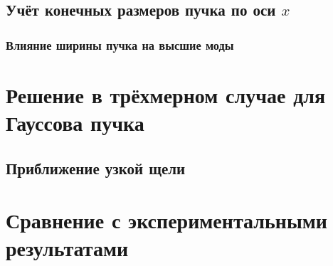 \section{Учёт конечных размеров пучка по оси $x$}
\subsection{Влияние ширины пучка на высшие моды}

\chapter{Решение в трёхмерном случае для Гауссова пучка}
\section{Приближение узкой щели}

\chapter{Сравнение с экспериментальными результатами}
